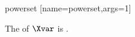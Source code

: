 \documentclass{stex}
\begin{document}
\begin{smodule}{powerset}
  [name=powerset,args=1]{}

  \begin{sdefinition}
    The  of $\Xvar$ is .
  \end{sdefinition}
\end{smodule}
\end{document}
